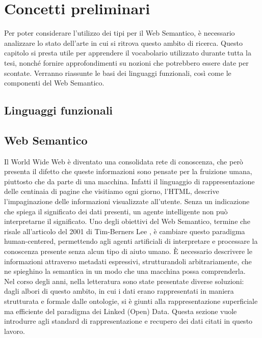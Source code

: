 \chapter[Concetti preliminari]{Concetti preliminari}
Per poter considerare l'utilizzo dei tipi per il Web Semantico, è necessario analizzare lo stato dell'arte in cui si ritrova questo ambito di ricerca.
Questo capitolo si presta utile per apprendere il vocabolario utilizzato durante tutta la tesi, nonché fornire approfondimenti su nozioni che potrebbero essere date per scontate.
Verranno riassunte le basi dei linguaggi funzionali, così come le componenti del Web Semantico.
\section[Linguaggi funzionali]{Linguaggi funzionali}

\section[Web Semantico]{Web Semantico}
Il World Wide Web è diventato una consolidata rete di conoscenza, che però presenta il difetto che queste informazioni sono pensate per la fruizione umana, piuttosto che da parte di una macchina. Infatti il linguaggio di rappresentazione delle centinaia di pagine che visitiamo ogni giorno, l’HTML, descrive l’impaginazione delle informazioni visualizzate all’utente. Senza un indicazione che spiega il significato dei dati presenti, un agente intelligente non può interpretarne il significato. Uno degli obiettivi del Web Semantico, termine che risale all'articolo del 2001 di Tim-Berners Lee \cite{berners2001semantic}, è cambiare questo paradigma human-centered, permettendo agli agenti artificiali di interpretare e processare la conoscenza presente senza alcun tipo di aiuto umano. È necessario descrivere le informazioni attraverso metadati espressivi, strutturandoli arbitrariamente, che ne spieghino la semantica in un modo che una macchina possa comprenderla.\\
Nel corso degli anni, nella letteratura sono state presentate diverse soluzioni: dagli albori di questo ambito, in cui i dati erano rappresentati in maniera strutturata e formale dalle ontologie, si è giunti alla rappresentazione superficiale ma efficiente del paradigma dei Linked (Open) Data. Questa sezione vuole introdurre agli standard di rappresentazione e recupero dei dati citati in questo lavoro.



